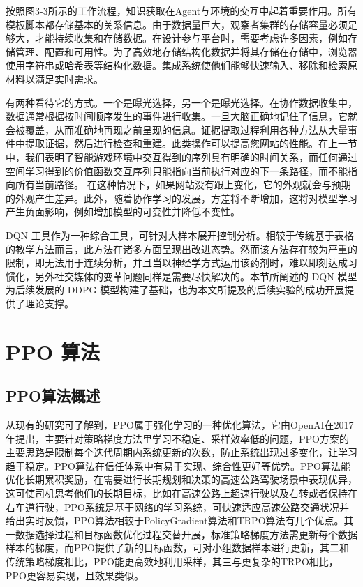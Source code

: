 按照图3-3所示的工作流程，知识获取在Agent与环境的交互中起着重要作用。所有模板脚本都存储基本的关系信息。由于数据量巨大，观察者集群的存储容量必须足够大，才能持续收集和存储数据。在设计参与平台时，需要考虑许多因素，例如存储管理、配置和可用性。为了高效地存储结构化数据并将其存储在存储中，浏览器使用字符串或哈希表等结构化数据。集成系统使他们能够快速输入、移除和检索原材料以满足实时需求。

有两种看待它的方式。一个是曝光选择，另一个是曝光选择。在协作数据收集中，数据通常根据按时间顺序发生的事件进行收集。一旦大脑正确地记住了信息，它就会被覆盖，从而准确地再现之前呈现的信息。证据提取过程利用各种方法从大量事件中提取证据，然后进行检查和重建。此类操作可以提高您网站的性能。在上一节中，我们表明了智能游戏环境中交互得到的序列具有明确的时间关系，而任何通过空间学习得到的价值函数交互序列只能指向当前执行对应的下一条路径，而不能指向所有当前路径。
在这种情况下，如果网站没有跟上变化，它的外观就会与预期的外观产生差异。此外，随着协作学习的发展，方差将不断增加，这将对模型学习产生负面影响，例如增加模型的可变性并降低不变性。

DQN 工具作为一种综合工具，可针对大样本展开控制分析。相较于传统基于表格的教学方法而言，此方法在诸多方面呈现出改进态势。然而该方法存在较为严重的限制，即无法用于连续分析，并且当以神经学方式运用该药剂时，难以即刻达成习惯化，另外社交媒体的变革问题同样是需要尽快解决的。本节所阐述的 DQN 模型为后续发展的 DDPG 模型构建了基础，也为本文所提及的后续实验的成功开展提供了理论支撑。

\section{PPO 算法}

\subsection{PPO算法概述 }

从现有的研究可了解到，PPO属于强化学习的一种优化算法，它由OpenAI在2017年提出，主要针对策略梯度方法里学习不稳定、采样效率低的问题，PPO方案的主要思路是限制每个迭代周期内系统更新的次数，防止系统出现过多变化，让学习趋于稳定。PPO算法在信任体系中有易于实现、综合性更好等优势\cite{schulman2017proxima}。PPO算法能优化长期累积奖励，在需要进行长期规划和决策的高速公路驾驶场景中表现优异，这可使司机思考他们的长期目标，比如在高速公路上超速行驶以及右转或者保持在右车道行驶，PPO系统是基于网络的学习系统，可快速适应高速公路交通状况并给出实时反馈，PPO算法相较于PolicyGradient算法和TRPO算法有几个优点。其一数据选择过程和目标函数优化过程交替开展，标准策略梯度方法需更新每个数据样本的梯度，而PPO提供了新的目标函数，可对小组数据样本进行更新，其二和传统策略梯度相比，PPO能更高效地利用采样，其三与更复杂的TRPO相比，PPO更容易实现，且效果类似\cite{dey2017gate}。

